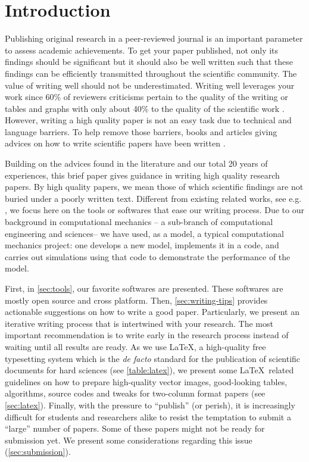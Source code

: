 \documentclass[authoryear,3p,times,preprint,review,fleqn]{elsarticle}
\numberwithin{equation}{section}
\theoremstyle{remark}
\begin{document}

\section{Introduction}

\showthe\textwidth %


Publishing original research in a peer-reviewed  journal is an important parameter to assess academic achievements. To get your paper published, not only its findings should be significant but it should also be well written such that these findings can be efficiently transmitted throughout the scientific community. The value of writing well should not be underestimated. Writing well leverages your work since 60\% of reviewers criticisms pertain to the quality of the writing or tables and graphs with only about 40\% to the quality of the scientific work \citep{iles1997guidebook}.
However, writing a high quality paper is not an easy task due to technical and language barriers. To help remove those barriers, books and articles giving advices on how to write scientific papers have been written \citep{day1998write,ashby2000write,plaxco2010art}. 


Building on the advices found in the literature and our total 20 years of experiences, this brief paper gives guidance in writing high quality research papers. By high quality papers, we mean those of which scientific findings are not buried under a poorly written text.
Different from existing related works, see e.g. \cite{day1998write,ashby2000write}, we focus here on the tools or softwares that ease our writing process. Due to our background in computational mechanics -- a sub-branch of computational engineering and sciences-- we have used, as a model, a typical computational mechanics project: one develops a new model, implements it in a code, and carries out simulations using that code to demonstrate the performance of the model. 

First, in \cref{sec:tools}, our favorite softwares are presented. These softwares are mostly open source and cross platform. Then, \cref{sec:writing-tips} provides actionable suggestions on how to write a good paper.  Particularly, we present an iterative writing process that is intertwined with your research. The most important recommendation is to write early in the research process instead of waiting until all results are ready.
As we use \LaTeX, a high-quality free typesetting system which is the \textit{de facto} standard for the publication of scientific documents for hard sciences (see \cref{table:latex}), we present some \LaTeX\ related guidelines on how to prepare high-quality vector images, good-looking tables, algorithms, source codes and tweaks for two-column format papers (see \cref{sec:latex}). 
Finally, with the pressure to “publish” (or perish), it is increasingly difficult for students and researchers alike to resist the temptation to submit a “large” number of papers. Some of these papers might not be ready for submission yet. We present some considerations regarding this issue (\cref{sec:submission}).
\end{document}
